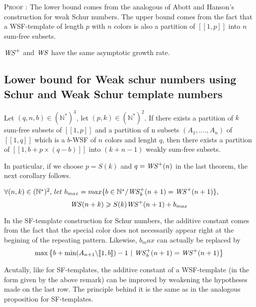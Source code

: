\textsc{Proof :} The lower bound comes from the analogous of Abott and Hanson's construction for weak Schur numbers.
The upper bound comes from the fact that a WSF-template of length \(p\) with \(n\) colors is also a partition of
\([\![1, p]\!]\) into \(n\) sum-free subsets.

\begin{remark}
	\(\mathit{WS}^+\) and \(\mathit{WS}\) have the same asymptotic growth rate.
\end{remark}


\subsection{Lower bound for Weak schur numbers using Schur and Weak Schur template numbers}


\begin{theorem}
Let \((q,n,b) \in (\mathbb{N}^*)^3\), let \( (p,k) \in (\mathbb{N}^*)^2\). If there exists a partition of \(k\)
sum-free subsets of \([\![1,p]\!]\) and a partition of n subsets \((A_1,....,A_n)\) of \([\![1, q]\!]\) which is a
\(b\)-WSF of \(n\) colors and lenght \(q\),
 then there exists a partition of \([\![1, b+p \times (q-b)]\!]\) into \((k+n-1)\) weakly sum-free subsets.
\end{theorem}

In particular, if we choose \(p = S(k)\) and \(q = \mathit{WS}^+(n)\) in the last theorem, the next corollary follows.


\begin{corollary}
\( \forall (n,k) \in (\mathbb{N}^*)^2 \text{, } let ~ b_{max}=max \{b\in \mathbb{N}^*/ \mathit{WS}_b^+(n+1) = \mathit{WS}^+(n+1)\},\) \[
\mathit{WS}(n+k) \geqslant S(k) \mathit{WS}^+(n+1)+b_{max}\]
\end{corollary}

\begin{remark}
In the SF-template construction for Schur numbers, the additive constant comes from the fact that the special color does
not necessarily appear right at the begining of the repeating pattern. Likewise, \(b_max\) can actually be replaced by \\
\[\max \left\{ b + \min (A_{n+1} \backslash [\![1, b ]\!]) - 1~|~ \mathit{WS}_b^+(n+1) = \mathit{WS}^+(n+1) \right\}\]
\end{remark}

\begin{remark}
Acutally, like for SF-templates, the additive constant of a WSF-template (in the form given by the above remark) can be improved
by weakening the hypotheses made on the last row. The principle behind it is the same as in the analogous proposition for SF-templates.
\end{remark}

